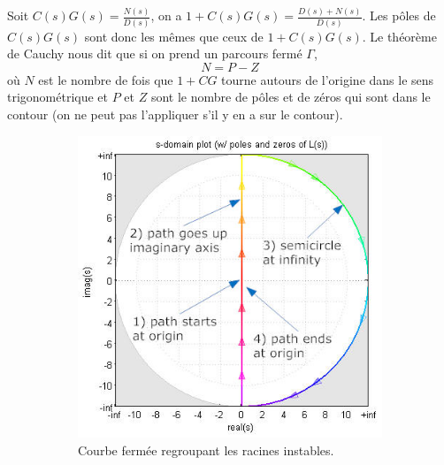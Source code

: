 Soit $C(s)G(s) = \frac{N(s)}{D(s)}$, on a $1 + C(s)G(s) = \frac{D(s)+N(s)}{D(s)}$.
Les pôles de $C(s)G(s)$ sont donc les mêmes que ceux de $1 + C(s)G(s)$.
Le théorème de Cauchy nous dit que si on prend un parcours fermé $\Gamma$,
\[ N = P - Z \]
où $N$ est le nombre de fois que $1 + CG$ tourne autours de l'origine dans le sens
trigonométrique et $P$ et $Z$ sont le nombre de pôles et de zéros qui sont dans
le contour (on ne peut pas l'appliquer s'il y en a sur le contour).

\begin{figure}
  \centering
  \begin{subfigure}{0.49\linewidth}
    \includegraphics[width=\linewidth,height=\linewidth]{nyquistpath.jpg}
    \caption{Courbe fermée regroupant les racines instables.}
    \label{fig:nyquistpath}
  \end{subfigure}
  \begin{subfigure}{0.49\linewidth}

\end{subfigure}
\end{figure}
